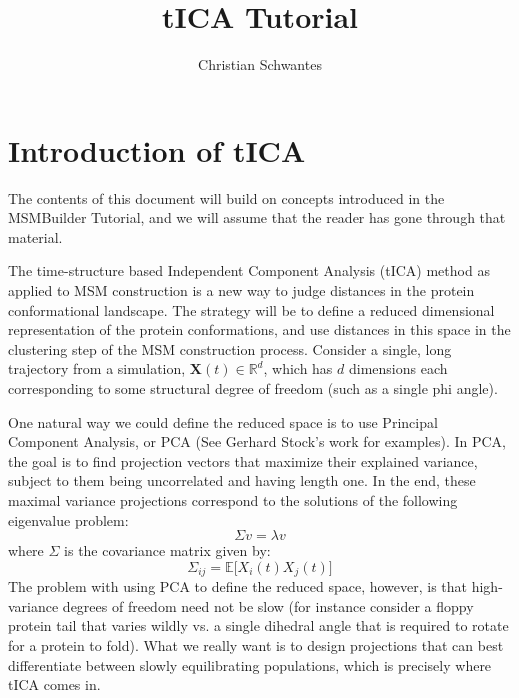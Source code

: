\documentclass[12pt]{article}
\title
{tICA Tutorial}
\author{Christian Schwantes}
\begin{document}
\maketitle

\tableofcontents

\newpage
\section{Introduction of tICA}

The contents of this document will build on concepts introduced in the MSMBuilder Tutorial, and we will assume that the reader has gone through that material.

The time-structure based Independent Component Analysis (tICA) method as applied to MSM construction is a new way to judge distances in the protein conformational landscape. The strategy will be to define a reduced dimensional representation of the protein conformations, and use distances in this space in the clustering step of the MSM construction process. Consider a single, long trajectory from a simulation, $\mathbf{X}(t) \in \mathbb{R}^d$, which has $d$ dimensions each corresponding to some structural degree of freedom (such as a single phi angle).

One natural way we could define the reduced space is to use Principal Component Analysis, or PCA (See Gerhard Stock's work for examples). In PCA, the goal is to find projection vectors that maximize their explained variance, subject to them being uncorrelated and having length one. In the end, these maximal variance projections correspond to the solutions of the following eigenvalue problem:
$$ \Sigma v = \lambda v$$ where $\Sigma$ is the covariance matrix given by:
$$ \Sigma_{ij} = \mathbb{E}\Big[ X_i(t) X_j(t) \Big] $$ The problem with using PCA to define the reduced space, however, is that high-variance degrees of freedom need not be slow (for instance consider a floppy protein tail that varies wildly vs. a single dihedral angle that is required to rotate for a protein to fold). What we really want is to design projections that can best differentiate between slowly equilibrating populations, which is precisely where tICA comes in.
\end{document}
